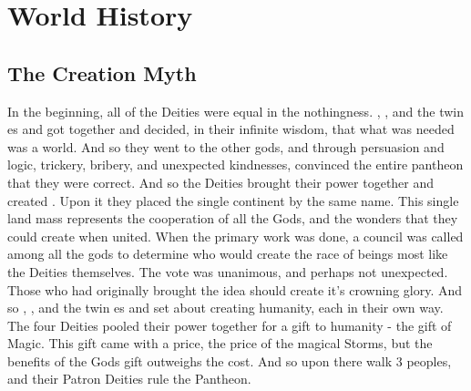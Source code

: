 \documentclass[blue]{GL2020}
\begin{document}
\name{\bWorld{}}

\section*{World History}

\subsection*{The Creation Myth}
In the beginning, all of the Deities were equal in the nothingness. \cFarmGod{}, \cTechGod{}, and the twin \cEbb{\God}es \cEbb{} and \cFlow{} got together and decided, in their infinite wisdom, that what was needed was a world. And so they went to the other gods, and through persuasion and logic, trickery, bribery, and unexpected kindnesses, convinced the entire pantheon that they were correct. And so the Deities brought their power together and created \pEarth{}. Upon it they placed the single continent by the same name. This single land mass represents the cooperation of all the Gods, and the wonders that they could create when united. When the primary work was done, a council was called among all the gods to determine who would create the race of beings most like the Deities themselves. The vote was unanimous, and perhaps not unexpected. Those who had originally brought the idea should create it's crowning glory. And so \cFarmGod{}, \cTechGod{}, and the twin \cEbb{\God}es \cEbb{} and \cFlow{} set about creating humanity, each in their own way. The four Deities pooled their power together for a gift to humanity - the gift of Magic.  This gift came with a price, the price of the magical Storms, but the benefits of the Gods gift outweighs the cost.  And so upon \pEarth{} there walk 3 peoples, and their Patron Deities rule the Pantheon.

\end{document}
